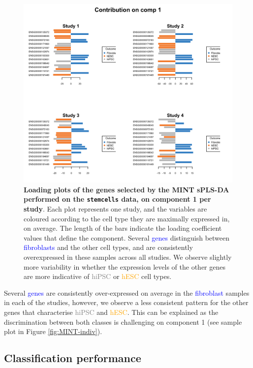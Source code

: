 \documentclass[]{book}
\begin{document}
\begin{figure}

{\centering \includegraphics[width=0.5\linewidth]{Figures/MINT/MINT-loading-1} 

}

\caption{\textbf{Loading plots of the genes selected by the
MINT sPLS-DA performed on the \texttt{stemcells} data, on component 1
per study}. Each plot represents one study, and the variables are
coloured according to the cell type they are maximally expressed in, on
average. The length of the bars indicate the loading coefficient values
that define the component. Several \textcolor{blue}{genes} distinguish
between \textcolor{blue}{fibroblasts} and the other cell types, and are
consistently overexpressed in these samples across all studies. We
observe slightly more variability in whether the expression levels of
the other genes are more indicative of \textcolor{grey}{hiPSC} or
\textcolor{orange}{hESC} cell types.}\label{fig:MINT-loading}
\end{figure}













Several \textcolor{blue}{genes} are consistently over-expressed on
average in the \textcolor{blue}{fibroblast} samples in each of the
studies, however, we observe a less consistent pattern for the other
genes that characterise \textcolor{grey}{hiPSC} and
\textcolor{orange}{hESC}. This can be explained as the discrimination
between both classes is challenging on component 1 (see sample plot in
Figure \ref{fig:MINT-indiv}).

\subsection{Classification performance}\label{mint:result:perf}
\end{document}
